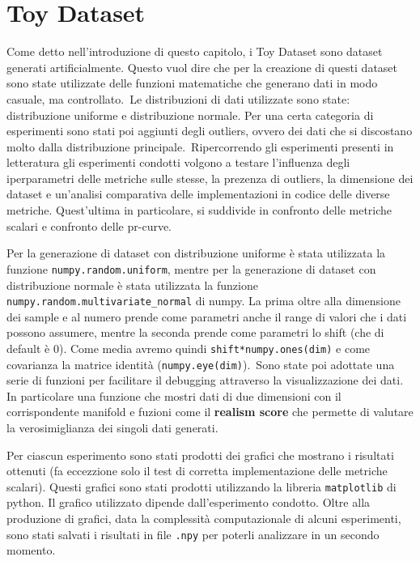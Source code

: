\section{Toy Dataset}
Come detto nell'introduzione di questo capitolo, i Toy Dataset sono dataset generati artificialmente. Questo vuol dire che per la creazione di questi dataset sono state utilizzate delle funzioni matematiche che generano dati in modo casuale, ma controllato.\
Le distribuzioni di dati utilizzate sono state: distribuzione uniforme e distribuzione normale. Per una certa categoria di esperimenti sono stati poi aggiunti degli outliers, ovvero dei dati che si discostano molto dalla distribuzione principale.\
Ripercorrendo gli esperimenti presenti in letteratura gli esperimenti condotti volgono a testare l'influenza degli iperparametri delle metriche sulle stesse, la prezenza di outliers, la dimensione dei dataset e un'analisi comparativa delle implementazioni in codice delle diverse metriche. Quest'ultima in particolare, si suddivide in confronto delle metriche scalari e confronto delle pr-curve.\

Per la generazione di dataset con distribuzione uniforme è stata utilizzata la funzione \texttt{numpy.random.uniform}, mentre per la generazione di dataset con distribuzione normale è stata utilizzata la funzione \texttt{numpy.random.multivariate\_normal} di numpy. La prima oltre alla dimensione dei sample e al numero prende come parametri anche il range di valori che i dati possono assumere, mentre la seconda prende come parametri lo shift (che di default è 0). Come media avremo quindi \texttt{shift*numpy.ones(dim)} e come covarianza la matrice identità (\texttt{numpy.eye(dim)}).\
Sono state poi adottate una serie di funzioni per facilitare il debugging attraverso la visualizzazione dei dati. In particolare una funzione che mostri dati di due dimensioni con il corrispondente manifold e fuzioni come il \textbf{realism score} che permette di valutare la verosimiglianza dei singoli dati generati.\

Per ciascun esperimento sono stati prodotti dei grafici che mostrano i risultati ottenuti (fa eccezzione solo il test di corretta implementazione delle metriche scalari). Questi grafici sono stati prodotti utilizzando la libreria \texttt{matplotlib} di python. Il grafico utilizzato dipende dall'esperimento condotto. Oltre alla produzione di grafici, data la complessità computazionale di alcuni esperimenti, sono stati salvati i risultati in file \texttt{.npy} per poterli analizzare in un secondo momento.\

